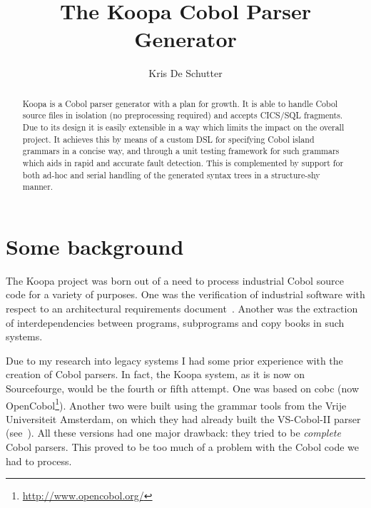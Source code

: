 \documentclass[a4paper]{article}
\begin{document}
\title{The Koopa Cobol Parser Generator}
\author{Kris De Schutter}
\date{}

\maketitle
\begin{abstract}
Koopa is a Cobol parser generator with a plan for growth. It is able to handle Cobol source files in isolation (no preprocessing required) and accepts CICS/SQL fragments. Due to its design it is easily extensible in a way which limits the impact on the overall project. It achieves this by means of a custom DSL for specifying Cobol island grammars in a concise way, and through a unit testing framework for such grammars which aids in rapid and accurate fault detection. This is complemented by support for both ad-hoc and serial handling of the generated syntax trees in a structure-shy manner.
\end{abstract}


\section{Some background}
\label{background}

The Koopa project was born out of a need to process industrial Cobol source code for a variety of purposes. One was the verification of industrial software with respect to an architectural requirements document~\cite{conf:csmr:KellensSDJP09}. Another was the extraction of interdependencies between programs, subprograms and copy books in such systems.

Due to my research into legacy systems I had some prior experience with the creation of Cobol parsers. In fact, the Koopa system, as it is now on Sourcefourge, would be the fourth or fifth attempt. One was based on cobc (now OpenCobol\footnote{\scriptsize\url{http://www.opencobol.org/}}). Another two were built using the grammar tools from the Vrije Universiteit Amsterdam, on which they had already built the VS-Cobol-II parser (see~\cite{LV01-SPE}). All these versions had one major drawback: they tried to be \emph{complete} Cobol parsers. This proved to be too much of a problem with the Cobol code we had to process.
\end{document}
